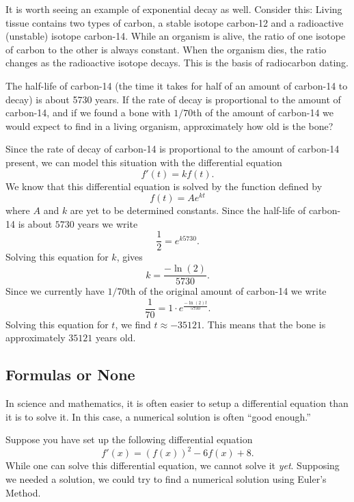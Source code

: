 It is worth seeing an example of exponential decay as well. Consider
this: Living tissue contains two types of carbon, a stable
isotope carbon-12 and a radioactive (unstable) isotope
carbon-14. While an organism is alive, the ratio of one isotope of
carbon to the other is always constant. When the organism dies, the
ratio changes as the radioactive isotope decays. This is the basis of
radiocarbon dating.


\begin{example}
The half-life of carbon-14 (the time it takes for half of an amount of
carbon-14 to decay) is about 5730 years. If the rate of decay is
proportional to the amount of carbon-14, and if we found a bone with
$1/70$th of the amount of carbon-14 we would expect to find in a living
organism, approximately how old is the bone?
\end{example}

\begin{solution}
Since the rate of decay of carbon-14 is proportional to the amount of
carbon-14 present, we can model this situation with the differential
equation
\[
f'(t) = k f(t).
\]
We know that this differential equation is solved by the function
defined by
\[
f(t) = A e^{kt}
\]
where $A$ and $k$ are yet to be determined constants. Since the
half-life of carbon-14 is about $5730$ years we write
\[
\frac{1}{2} = e^{k 5730}.
\]
Solving this equation for $k$, gives
\[
k = \frac{-\ln(2)}{5730}.
\]
Since we currently have $1/70$th of the original amount of carbon-14
we write
\[
\frac{1}{70} = 1\cdot e^{\frac{-\ln(2)t}{5730}}.
\]
Solving this equation for $t$, we find $t \approx -35121$. This means
that the bone is approximately $35121$ years old.
\end{solution}


\subsection*{Formulas or None}

In science and mathematics, it is often easier to setup a differential
equation than it is to solve it. In this case, a numerical
solution is often ``good enough.''

Suppose you have set up the following differential equation
\[
f'(x) = \left(f(x)\right)^2 - 6f(x) + 8.
\]
While one can solve this differential equation, we cannot solve it
\textit{yet}. Supposing we needed a solution, we could try to find a
numerical solution using Euler's Method.

